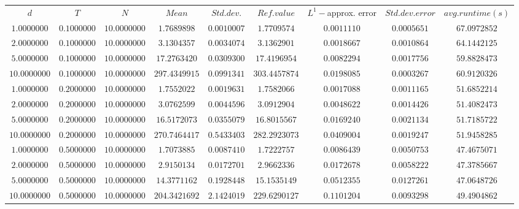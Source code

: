 \begin{tabular}{ccccccccc}
$d$ & $T$ & $N$ & $Mean$ & $Std. dev.$ & $Ref. value$ & $L^1-$approx. error & $Std. dev. error$ & $avg. runtime (s)$\\
$1.0000000$ & $0.1000000$ & $10.0000000$ & $1.7689898$ & $0.0010007$ & $1.7709574$ & $0.0011110$ & $0.0005651$ & $67.0972852$\\
$2.0000000$ & $0.1000000$ & $10.0000000$ & $3.1304357$ & $0.0034074$ & $3.1362901$ & $0.0018667$ & $0.0010864$ & $64.1442125$\\
$5.0000000$ & $0.1000000$ & $10.0000000$ & $17.2763420$ & $0.0309300$ & $17.4196954$ & $0.0082294$ & $0.0017756$ & $59.8828473$\\
$10.0000000$ & $0.1000000$ & $10.0000000$ & $297.4349915$ & $0.0991341$ & $303.4457874$ & $0.0198085$ & $0.0003267$ & $60.9120326$\\
$1.0000000$ & $0.2000000$ & $10.0000000$ & $1.7552022$ & $0.0019631$ & $1.7582066$ & $0.0017088$ & $0.0011165$ & $51.6852214$\\
$2.0000000$ & $0.2000000$ & $10.0000000$ & $3.0762599$ & $0.0044596$ & $3.0912904$ & $0.0048622$ & $0.0014426$ & $51.4082473$\\
$5.0000000$ & $0.2000000$ & $10.0000000$ & $16.5172073$ & $0.0355079$ & $16.8015567$ & $0.0169240$ & $0.0021134$ & $51.7185722$\\
$10.0000000$ & $0.2000000$ & $10.0000000$ & $270.7464417$ & $0.5433403$ & $282.2923073$ & $0.0409004$ & $0.0019247$ & $51.9458285$\\
$1.0000000$ & $0.5000000$ & $10.0000000$ & $1.7073885$ & $0.0087410$ & $1.7222757$ & $0.0086439$ & $0.0050753$ & $47.4675071$\\
$2.0000000$ & $0.5000000$ & $10.0000000$ & $2.9150134$ & $0.0172701$ & $2.9662336$ & $0.0172678$ & $0.0058222$ & $47.3785667$\\
$5.0000000$ & $0.5000000$ & $10.0000000$ & $14.3771162$ & $0.1928448$ & $15.1535149$ & $0.0512355$ & $0.0127261$ & $47.0648726$\\
$10.0000000$ & $0.5000000$ & $10.0000000$ & $204.3421692$ & $2.1424019$ & $229.6290127$ & $0.1101204$ & $0.0093298$ & $49.4904862$\\
\end{tabular}
